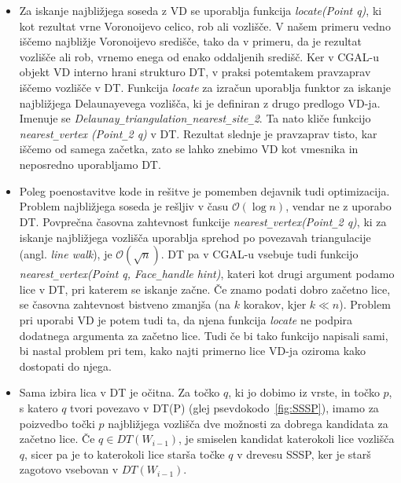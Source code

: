 \documentclass[a4paper, 12pt]{book}
\newcommand{\OO}{\ensuremath{\mathcal{O}}} %
\newcommand{\U}{\texttt{\_}}
\begin{document}
\begin{itemize}
\item Za iskanje najbližjega soseda z VD se uporablja funkcija \textit{locate(Point q)}, ki kot rezultat vrne Voronoijevo celico, rob ali vozlišče. V našem primeru vedno iščemo najbližje Voronoijevo središče, tako da v primeru, da je rezultat vozlišče ali rob, vrnemo enega od enako oddaljenih središč. Ker v CGAL-u objekt VD interno hrani strukturo DT, v praksi potemtakem pravzaprav iščemo vozlišče v DT. Funkcija \textit{locate} za izračun uporablja funktor za iskanje najbližjega Delaunayevega vozlišča, ki je definiran z drugo predlogo VD-ja. Imenuje se \textit{Delaunay\U triangulation\U nearest\U site\U 2}. Ta nato kliče funkcijo \textit{nearest\U vertex (Point\U 2 q)} v DT. Rezultat slednje je pravzaprav tisto, kar iščemo od samega začetka, zato se lahko znebimo VD kot vmesnika in neposredno uporabljamo DT.
\item Poleg poenostavitve kode in rešitve je pomemben dejavnik tudi optimizacija. Problem najbližjega soseda je rešljiv v času $\OO(\log n)$, vendar ne z uporabo DT. Povprečna časovna zahtevnost funkcije \textit{nearest\U vertex(Point\U 2 q)}, ki za iskanje najbližjega vozlišča uporablja sprehod po povezavah triangulacije (angl. \textit{line walk}), je $\OO(\sqrt{n})$. DT pa v CGAL-u vsebuje tudi funkcijo \textit{nearest\U vertex(Point q, Face\U handle hint)}, kateri kot drugi argument podamo lice v DT, pri katerem se iskanje začne. Če znamo podati dobro začetno lice, se časovna zahtevnost bistveno zmanjša (na $k$ korakov, kjer $k \ll n$). Problem pri uporabi VD je potem tudi ta, da njena funkcija \textit{locate} ne podpira dodatnega argumenta za začetno lice. Tudi če bi tako funkcijo napisali sami, bi nastal problem pri tem, kako najti primerno lice VD-ja oziroma kako dostopati do njega. 
\item Sama izbira lica v DT je očitna. Za točko $q$, ki jo dobimo iz vrste, in točko $p$, s katero $q$ tvori povezavo v DT(P) (glej psevdokodo~\ref{fig:SSSP}), imamo za poizvedbo točki $p$ najbližjega vozlišča dve možnosti za dobrega kandidata za začetno lice. Če $q\in DT(W_{i-1})$, je smiselen kandidat katerokoli lice vozlišča $q$, sicer pa je to katerokoli lice starša točke $q$ v drevesu SSSP, ker je starš zagotovo vsebovan v $DT(W_{i-1})$. 
\end{itemize}
\end{document}
